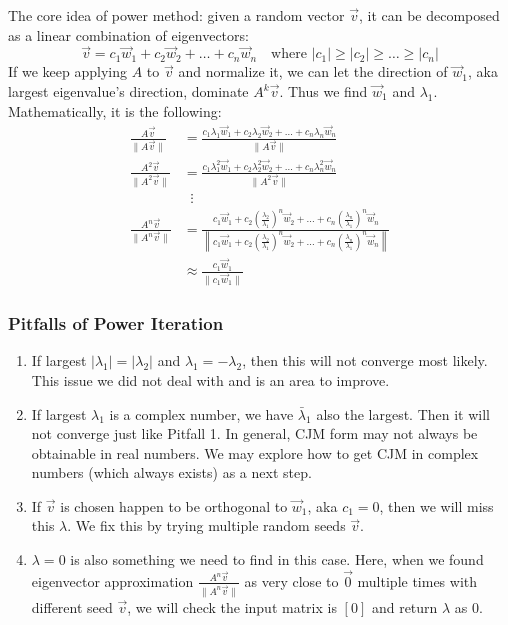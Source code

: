 \documentclass[12pt, a4paper]{article}
\begin{document}
The core idea of power method: given a random vector $\vec{v}$, it can be decomposed as a linear combination of eigenvectors:
\[
\vec{v} = c_1 \vec{w}_1 + c_2 \vec{w}_2 + \dots + c_n \vec{w}_n \quad \text{where } |c_1| \ge |c_2| \ge \dots \ge |c_n|
\]
If we keep applying $A$ to $\vec{v}$ and normalize it, we can let the direction of $\vec{w}_1$, aka largest eigenvalue's direction, dominate $A^k \vec{v}$. Thus we find $\vec{w}_1$ and $\lambda_1$. Mathematically, it is the following:
\begin{align*}
    \frac{A\vec{v}}{\|A\vec{v}\|} &= \frac{c_1 \lambda_1 \vec{w}_1 + c_2 \lambda_2 \vec{w}_2 + \dots + c_n \lambda_n \vec{w}_n}{\|A\vec{v}\|} \\[0.5em]
    \frac{A^2\vec{v}}{\|A^2\vec{v}\|} &= \frac{c_1 \lambda_1^2 \vec{w}_1 + c_2 \lambda_2^2 \vec{w}_2 + \dots + c_n \lambda_n^2 \vec{w}_n}{\|A^2\vec{v}\|} \\
    &\;\;\vdots \\
    \frac{A^n\vec{v}}{\|A^n\vec{v}\|} &= \frac{c_1 \vec{w}_1 + c_2 \left(\frac{\lambda_2}{\lambda_1}\right)^n \vec{w}_2 + \dots + c_n \left(\frac{\lambda_n}{\lambda_1}\right)^n \vec{w}_n}{\left\| c_1 \vec{w}_1 + c_2 \left(\frac{\lambda_2}{\lambda_1}\right)^n \vec{w}_2 + \dots + c_n \left(\frac{\lambda_n}{\lambda_1}\right)^n \vec{w}_n \right\|} \\[0.5em]
    &\approx \frac{c_1 \vec{w}_1}{\|c_1 \vec{w}_1\|}
\end{align*}

\subsubsection*{Pitfalls of Power Iteration}

\begin{enumerate}[label=\textbf{Pitfall \arabic*:}, leftmargin=1.5em]
    \item If largest $|\lambda_1| = |\lambda_2|$ and $\lambda_1 = -\lambda_2$, then this will not converge most likely. This issue we did not deal with and is an area to improve.
    \item If largest $\lambda_1$ is a complex number, we have $\bar{\lambda}_1$ also the largest. Then it will not converge just like Pitfall 1. In general, CJM form may not always be obtainable in real numbers. We may explore how to get CJM in complex numbers (which always exists) as a next step.
    \item If $\vec{v}$ is chosen happen to be orthogonal to $\vec{w}_1$, aka $c_1 = 0$, then we will miss this $\lambda$. We fix this by trying multiple random seeds $\vec{v}$.
    \item $\lambda = 0$ is also something we need to find in this case. Here, when we found eigenvector approximation $\frac{A^n\vec{v}}{\|A^n\vec{v}\|}$ as very close to $\vec{0}$ multiple times with different seed $\vec{v}$, we will check the input matrix is $[0]$ and return $\lambda$ as $0$.
\end{enumerate}
\end{document}
